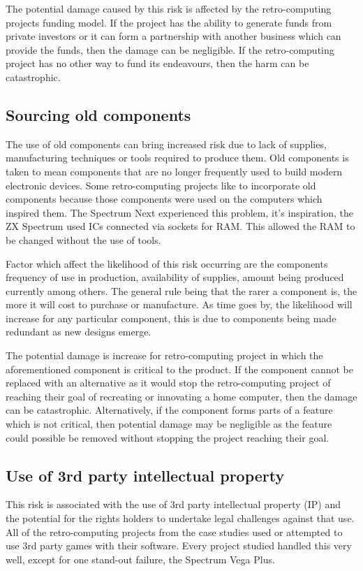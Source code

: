The potential damage caused by this risk is affected by the retro-computing projects funding model. If the project has the ability to generate funds from private investors or it can form a partnership with another business which can provide the funds, then the damage can be negligible. If the retro-computing project has no other way to fund its endeavours, then the harm can be catastrophic. 


\subsection{Sourcing old components}
The use of old components can bring increased risk due to lack of supplies, manufacturing techniques or tools required to produce them. Old components is taken to mean components that are no longer frequently used to build modern electronic devices. Some retro-computing projects like to incorporate old components because those components were used on the computers which inspired them. The Spectrum Next experienced this problem, it's inspiration, the ZX Spectrum used ICs connected via sockets for RAM. This allowed the RAM to be changed without the use of tools. 

Factor which affect the likelihood of this risk occurring are the components frequency of use in production, availability of supplies, amount being produced currently among others. The general rule being that the rarer a component is, the more it will cost to purchase or manufacture. As time goes by, the likelihood will increase for any particular component, this is due to components being made redundant as new designs emerge.

The potential damage is increase for retro-computing project in which the aforementioned component is critical to the product. If the component cannot be replaced with an alternative as it would stop the retro-computing project of reaching their goal of recreating or innovating a home computer, then the damage can be catastrophic. Alternatively, if the component forms parts of a feature which is not critical, then potential damage may be negligible as the feature could possible be removed without stopping the project reaching their goal.


\subsection{Use of 3rd party intellectual property}
This risk is associated with the use of 3rd party intellectual property (IP) and the potential for the rights holders to undertake legal challenges against that use. All of the retro-computing projects from the case studies used or attempted to use 3rd party games with their software. Every project studied handled this very well, except for one stand-out failure, the Spectrum Vega Plus. 

